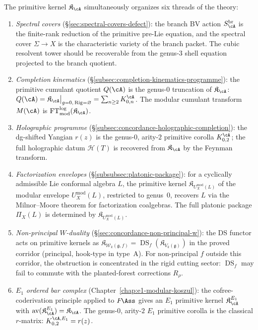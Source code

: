 \begin{remark}
\label{rem:primitive-kernel-organizing-center}
The primitive kernel $\mathfrak{K}_\cA$ simultaneously organizes
six threads of the theory:
\begin{enumerate}[label=\textup{(\roman*)}]
\item \emph{Spectral covers}
  \textup{(}\S\textup{\ref{sec:spectral-covers-defect})}: the branch
  BV action $S_\cA^{\mathrm{br}}$ is the finite-rank reduction of the
  primitive pre-Lie equation, and the spectral cover
  $\Sigma \to X$ is the characteristic variety of the branch packet.
  The cubic resolvent tower should be recoverable from the genus-$3$
  shell equation projected to the branch quotient.
\item \emph{Completion kinematics}
  \textup{(}\S\textup{\ref{subsec:completion-kinematics-programme})}:
  the primitive cumulant quotient $Q(\cA)$ is the genus-$0$ truncation
  of $\mathfrak{K}_\cA$:
  $Q(\cA) = \mathfrak{K}_\cA\big|_{g=0,\,\operatorname{Rig}=\varnothing}
  = \sum_{n \geq 2} K_{0,n}^\cA$.
  The modular cumulant transform $M(\cA)$ is
  $\operatorname{FT}^{\log}_{\mathrm{mod}}(\mathfrak{K}_\cA)$.
\item \emph{Holographic programme}
  \textup{(}\S\textup{\ref{subsec:concordance-holographic-completion})}:
  the dg-shifted Yangian $r(z)$ is the genus-$0$, arity-$2$ primitive
  corolla $K_{0,2}^\cA$; the full holographic datum
  $\mathcal{H}(T)$ is recovered from $\mathfrak{K}_\cA$ by the
  Feynman transform.
\item \emph{Factorization envelopes}
  \textup{(}\S\textup{\ref{subsubsec:platonic-package})}:
  for a cyclically admissible Lie conformal algebra $L$, the primitive
  kernel $\mathfrak{K}_{U^{\mathrm{mod}}_X(L)}$ of the modular
  envelope $U^{\mathrm{mod}}_X(L)$, restricted to genus~$0$, recovers
  $L$ via the Milnor--Moore theorem for factorization coalgebras.
  The full platonic package $\Pi_X(L)$ is determined by
  $\mathfrak{K}_{U^{\mathrm{mod}}_X(L)}$.
\item \emph{Non-principal $W$-duality}
  \textup{(}\S\textup{\ref{sec:concordance-non-principal-w})}:
  the DS functor acts on primitive kernels as
  $\mathfrak{K}_{\mathcal{W}_k(\mathfrak{g},f)}
  = \operatorname{DS}_f(\mathfrak{K}_{V_k(\mathfrak{g})})$
  in the proved corridor \textup{(}principal, hook-type in type~A\textup{)}.
  For non-principal $f$ outside this corridor, the obstruction is
  concentrated in the rigid cutting sector: $\operatorname{DS}_f$
  may fail to commute with the planted-forest corrections $R_\rho$.
\item \emph{$E_1$ ordered bar complex}
  \textup{(}Chapter~\textup{\ref{chap:e1-modular-koszul})}:
  the cofree-coderivation principle applied to $F\!\Ass$ gives an
  $E_1$ primitive kernel $\mathfrak{K}_\cA^{E_1}$ with
  $\operatorname{av}(\mathfrak{K}_\cA^{E_1}) = \mathfrak{K}_\cA$.
  The genus-$0$, arity-$2$ $E_1$ primitive corolla is the classical
  $r$-matrix: $K_{0,2}^{\cA,E_1} = r(z)$.
\end{enumerate}
\end{remark}

